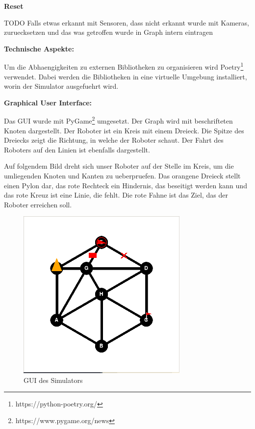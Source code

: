 \textbf{Reset}

TODO
Falls etwas erkannt mit Sensoren, dass nicht erkannt wurde mit Kameras, zuruecksetzen und das was getroffen wurde in Graph intern eintragen

\textbf{Technische Aspekte:}

Um die Abhaengigkeiten zu externen Bibliotheken zu organisieren wird Poetry\footnote{https://python-poetry.org/} verwendet. Dabei werden die Bibliotheken in eine virtuelle Umgebung installiert, worin der Simulator ausgefuehrt wird.

\textbf{Graphical User Interface:}

Das GUI wurde mit PyGame\footnote{https://www.pygame.org/news} umgesetzt. Der Graph wird mit beschrifteten Knoten dargestellt. Der Roboter ist ein Kreis mit einem Dreieck. Die Spitze des Dreiecks zeigt die Richtung, in welche der Roboter schaut.
Der Fahrt des Roboters auf den Linien ist ebenfalls dargestellt.

Auf folgendem Bild dreht sich unser Roboter auf der Stelle im Kreis, um die umliegenden Knoten und Kanten zu ueberpruefen.
Das orangene Dreieck stellt einen Pylon dar, das rote Rechteck ein Hindernis, das beseitigt werden kann und das rote Kreuz ist eine Linie, die fehlt. Die rote Fahne ist das Ziel, das der Roboter erreichen soll.

\begin{figure}[H]
\centering
\includegraphics[width=0.75\textwidth]{assets/informatik-prototyp/simulator/sim-ui.png}
\caption{GUI des Simulators}
\label{fig:sim-gui}
\end{figure}

